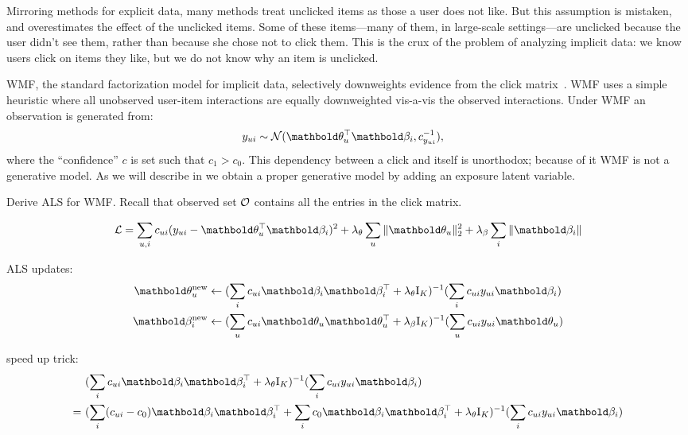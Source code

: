Mirroring methods for explicit data, many methods treat unclicked items as those a user does not like.  But this assumption is mistaken, and overestimates the effect of the unclicked items.  Some of these
items---many of them, in large-scale settings---are unclicked because
the user didn't see them, rather than because she chose not to
click them.  This is the crux of the problem of analyzing implicit
data: we know users click on items they like, but we do not know why
an item is unclicked.

\gls{WMF}, the standard factorization model for implicit
data, selectively downweights evidence from the click
matrix~\citep{hu2008collaborative}.  \gls{WMF} uses a simple heuristic where all
unobserved user-item interactions are equally downweighted vis-a-vis the
observed interactions. Under \gls{WMF} an observation is generated from:
\begin{align*} 
y_{ui} &\sim \mathcal{N}(\mb\theta_u^\top\mb\beta_i, c^{-1}_{y_{ui}}),
\end{align*}
where the ``confidence'' $c$ is set such that $c_1 > c_0$. This dependency between a
click and itself is unorthodox; because of it \gls{WMF} is not a generative
model. As we will describe in  we obtain a proper generative
model by adding an exposure latent variable. 

\PP Derive ALS for \gls{WMF}. Recall that observed set $\mathcal{O}$ contains all the entries in the click matrix.

\begin{equation*}
\cL = \sum_{u, i} c_{ui}(y_{ui} - \mb\theta_u^\top\mb\beta_i)^2 + \lambda_\theta \sum_u \|\mb\theta_u \|^2_2 + \lambda_\beta \sum_i \|\mb\beta_i \|
\end{equation*}

\PP ALS updates:
\begin{equation}
\begin{split}
\mb\theta_u^\new &\leftarrow (\sum_i c_{ui} \mb\beta_i \mb\beta_i^\top + \lambda_\theta \mathrm{I}_K)^{-1} (\sum_i c_{ui} y_{ui} \mb\beta_i)\\
\mb\beta_i^\new &\leftarrow (\sum_u c_{ui} \mb\theta_u \mb\theta_u^\top + \lambda_\beta \mathrm{I}_K)^{-1} (\sum_u c_{ui} y_{ui} \mb\theta_u)
\end{split}
\label{chpt:background:eq:als_wmf}
\end{equation}

\PP speed up trick:
\begin{align*}
&(\sum_i c_{ui} \mb\beta_i \mb\beta_i^\top + \lambda_\theta \mathrm{I}_K)^{-1} (\sum_i c_{ui} y_{ui} \mb\beta_i)\\
=~& (\sum_i (c_{ui} - c_0) \mb\beta_i \mb\beta_i^\top + \sum_i c_0 \mb\beta_i \mb\beta_i^\top + \lambda_\theta \mathrm{I}_K)^{-1} (\sum_i c_{ui} y_{ui} \mb\beta_i)
\end{align*}

